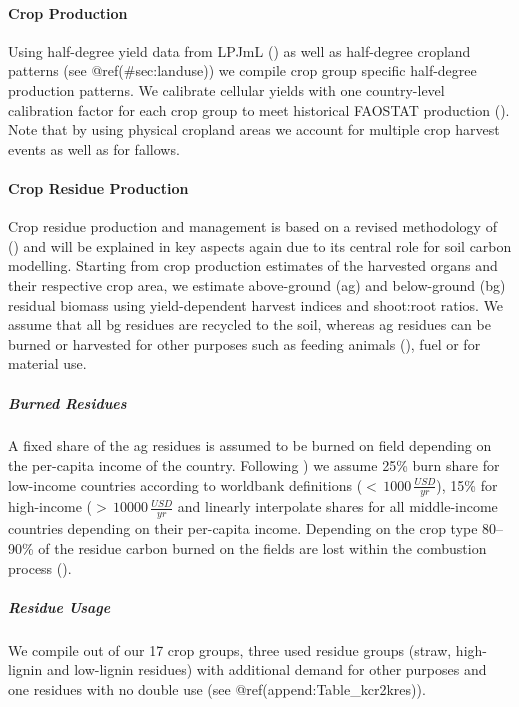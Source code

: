 \documentclass[gc, manuscript]{copernicus}
\begin{document}
\paragraph{Crop Production}

Using half-degree yield data from LPJmL (\citep{LPJmL4_1}) as well as
half-degree cropland patterns (see @ref(\#sec:landuse)) we compile crop
group specific half-degree production patterns. We calibrate cellular
yields with one country-level calibration factor for each crop group to
meet historical FAOSTAT production (\citep{FAOSTAT}). Note that by using
physical cropland areas we account for multiple crop harvest events as
well as for fallows.

\paragraph{Crop Residue Production}

Crop residue production and management is based on a revised methodology
of (\citep{bodirsky2012}) and will be explained in key aspects again due
to its central role for soil carbon modelling. Starting from crop
production estimates of the harvested organs and their respective crop
area, we estimate above-ground (ag) and below-ground (bg) residual
biomass using yield-dependent harvest indices and shoot:root ratios. We
assume that all bg residues are recycled to the soil, whereas ag
residues can be burned or harvested for other purposes such as feeding
animals (\citep{weindl}), fuel or for material use.

\subparagraph{Burned Residues}

A fixed share of the ag residues is assumed to be burned on field
depending on the per-capita income of the country. Following
\citep{smil1999}) we assume 25\% burn share for low-income countries
according to worldbank definitions (\(<\,1000\,\tfrac{USD}{yr}\)), 15\%
for high-income (\(>\,10000\,\tfrac{USD}{yr}\) and linearly interpolate
shares for all middle-income countries depending on their per-capita
income. Depending on the crop type 80--90\% of the residue carbon burned
on the fields are lost within the combustion process
(\citep{ipcc_2006_2006}).

\subparagraph{Residue Usage}

We compile out of our 17 crop groups, three used residue groups (straw,
high-lignin and low-lignin residues) with additional demand for other
purposes and one residues with no double use (see
@ref(append:Table\_kcr2kres)).
\end{document}
